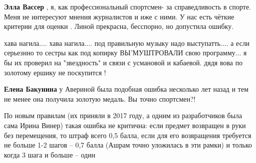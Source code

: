 \begin{itemize}
\begin{itemize}
 
\textbf{Элла Вассер} , я, как профессиональный спортсмен- за справедливость в
спорте. Меня не интересуют мнения журналистов и иже с ними. У нас есть чёткие
критерии для оценки . Линой прекрасна, бесспорно, но допустила ошибку.

 

хава нагила.... хава нагила.... под правильную музыку надо выступатть.... а если
серьезнно то сестры как под копирку ВЫ'МУШТРОВАЛИ свою программу... я бы их
проверил на "звездность" и связи с усмановой и кабаевой. дядя вова по золотому
ершику не поскупится !


 
\textbf{Елена Бакунина} у Авериной была подобная ошибка несколько лет назад и
тем не менее она получила золотую медаль. Вы точно спортсмен?!

 

По новым правилам (их приняли в 2017 году, а одним из разработчиков была сама
Ирина Винер) такая ошибка не критична: если предмет возвращен в руки без
перемещения, то штраф всего 0,5 балла, если для его возвращения требуется не
больше 1-2 шагов – 0,7 балла (Ашрам точно уложилась в эти рамки) и только когда
3 шага и больше – один

 

\end{itemize}
\end{itemize}
